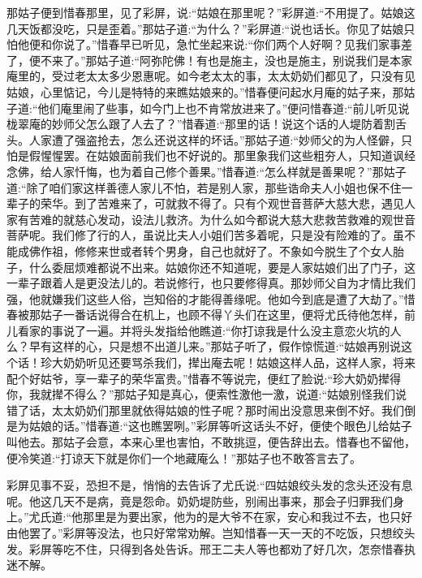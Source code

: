 \begin{parag}
    那姑子便到惜春那里，见了彩屏，说:“姑娘在那里呢？”彩屏道:“不用提了。姑娘这几天饭都没吃，只是歪着。”那姑子道:“为什么？”彩屏道:“说也话长。你见了姑娘只怕他便和你说了。”惜春早已听见，急忙坐起来说:“你们两个人好啊？见我们家事差了，便不来了。”那姑子道:“阿弥陀佛！有也是施主，没也是施主，别说我们是本家庵里的，受过老太太多少恩惠呢。如今老太太的事，太太奶奶们都见了，只没有见姑娘，心里惦记，今儿是特特的来瞧姑娘来的。”惜春便问起水月庵的姑子来，那姑子道:“他们庵里闹了些事，如今门上也不肯常放进来了。”便问惜春道:“前儿听见说栊翠庵的妙师父怎么跟了人去了？”惜春道:“那里的话！说这个话的人堤防着割舌头。人家遭了强盗抢去，怎么还说这样的坏话。”那姑子道:“妙师父的为人怪僻，只怕是假惺惺罢。在姑娘面前我们也不好说的。那里象我们这些粗夯人，只知道讽经念佛，给人家忏悔，也为着自己修个善果。”惜春道:“怎么样就是善果呢？”那姑子道:“除了咱们家这样善德人家儿不怕，若是别人家，那些诰命夫人小姐也保不住一辈子的荣华。到了苦难来了，可就救不得了。只有个观世音菩萨大慈大悲，遇见人家有苦难的就慈心发动，设法儿救济。为什么如今都说大慈大悲救苦救难的观世音菩萨呢。我们修了行的人，虽说比夫人小姐们苦多着呢，只是没有险难的了。虽不能成佛作祖，修修来世或者转个男身，自己也就好了。不象如今脱生了个女人胎子，什么委屈烦难都说不出来。姑娘你还不知道呢，要是人家姑娘们出了门子，这一辈子跟着人是更没法儿的。若说修行，也只要修得真。那妙师父自为才情比我们强，他就嫌我们这些人俗，岂知俗的才能得善缘呢。他如今到底是遭了大劫了。”惜春被那姑子一番话说得合在机上，也顾不得丫头们在这里，便将尤氏待他怎样，前儿看家的事说了一遍。并将头发指给他瞧道:“你打谅我是什么没主意恋火坑的人么？早有这样的心，只是想不出道儿来。”那姑子听了，假作惊慌道:“姑娘再别说这个话！珍大奶奶听见还要骂杀我们，撵出庵去呢！姑娘这样人品，这样人家，将来配个好姑爷，享一辈子的荣华富贵。”惜春不等说完，便红了脸说:“珍大奶奶撵得你，我就撵不得么？”那姑子知是真心，便索性激他一激，说道:“姑娘别怪我们说错了话，太太奶奶们那里就依得姑娘的性子呢？那时闹出没意思来倒不好。我们倒是为姑娘的话。”惜春道:“这也瞧罢咧。”彩屏等听这话头不好，便使个眼色儿给姑子叫他去。那姑子会意，本来心里也害怕，不敢挑逗，便告辞出去。惜春也不留他，便冷笑道:“打谅天下就是你们一个地藏庵么！”那姑子也不敢答言去了。
\end{parag}


\begin{parag}
    彩屏见事不妥，恐担不是，悄悄的去告诉了尤氏说:“四姑娘绞头发的念头还没有息呢。他这几天不是病，竟是怨命。奶奶堤防些，别闹出事来，那会子归罪我们身上。”尤氏道:“他那里是为要出家，他为的是大爷不在家，安心和我过不去，也只好由他罢了。”彩屏等没法，也只好常常劝解。岂知惜春一天一天的不吃饭，只想绞头发。彩屏等吃不住，只得到各处告诉。邢王二夫人等也都劝了好几次，怎奈惜春执迷不解。
\end{parag}


